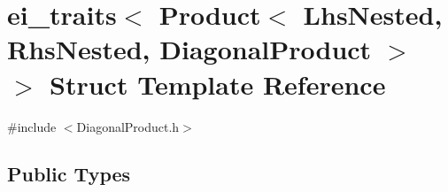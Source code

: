 \hypertarget{structei__traits_3_01_product_3_01_lhs_nested_00_01_rhs_nested_00_01_diagonal_product_01_4_01_4}{\section{ei\-\_\-traits$<$ Product$<$ Lhs\-Nested, Rhs\-Nested, Diagonal\-Product $>$ $>$ Struct Template Reference}
\label{structei__traits_3_01_product_3_01_lhs_nested_00_01_rhs_nested_00_01_diagonal_product_01_4_01_4}
}


{\ttfamily \#include $<$Diagonal\-Product.\-h$>$}

\subsection*{Public Types}
